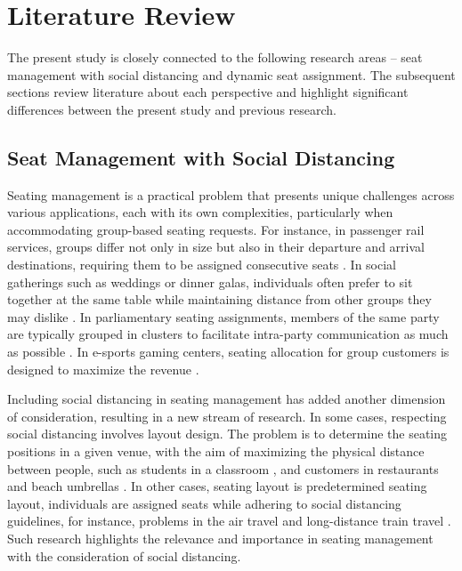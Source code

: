 \section{Literature Review}\label{literature}
The present study is closely connected to the following research areas -- seat management with social distancing and dynamic seat assignment. The subsequent sections review literature about each perspective and highlight significant differences between the present study and previous research.


\subsection{Seat Management with Social Distancing}
Seating management is a practical problem that presents unique challenges across various applications, each with its own complexities, particularly when accommodating group-based seating requests. For instance, in passenger rail services, groups differ not only in size but also in their departure and arrival destinations, requiring them to be assigned consecutive seats \cite{clausen2010off, deplano2019offline}. In social gatherings such as weddings or dinner galas, individuals often prefer to sit together at the same table while maintaining distance from other groups they may dislike \cite{lewis2016creating}. In parliamentary seating assignments, members of the same party are typically grouped in clusters to facilitate intra-party communication as much as possible \cite{vangerven2022parliament}. In e-sports gaming centers, seating allocation for group customers is designed to maximize the revenue \cite{kwag2022optimal}.


Including social distancing in seating management has added another dimension of consideration, resulting in a new stream of research. In some cases, respecting social distancing involves layout design. The problem is to determine the seating positions in a given venue, with the aim of maximizing the physical distance between people, such as students in a classroom \cite{bortolete2022support, dundar2021seat}, and customers in restaurants and beach umbrellas \cite{fischetti2023safe}. In other cases, seating layout is predetermined seating layout, individuals are assigned seats while adhering to social distancing guidelines, for instance, problems in the air travel \cite{ghorbani2020model, salari2020social} and long-distance train travel \cite{haque2022optimization}. Such research highlights the relevance and importance in seating management with the consideration of social distancing.


